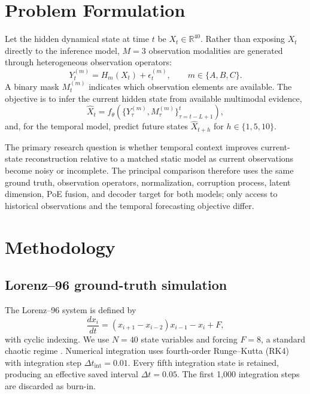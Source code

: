 \documentclass[10pt,twocolumn]{article}
\begin{document}
\section{Problem Formulation}
Let the hidden dynamical state at time $t$ be $X_t\in\mathbb{R}^{40}$. Rather than exposing $X_t$ directly to the inference model, $M=3$ observation modalities are generated through heterogeneous observation operators:
\begin{equation}
Y_t^{(m)}=H_m(X_t)+\epsilon_t^{(m)}, \qquad m\in\{A,B,C\}.
\end{equation}
A binary mask $M_t^{(m)}$ indicates which observation elements are available. The objective is to infer the current hidden state from available multimodal evidence,
\begin{equation}
\hat X_t=f_{\theta}\left(\{Y_{\tau}^{(m)},M_{\tau}^{(m)}\}_{\tau=t-L+1}^{t}\right),
\end{equation}
and, for the temporal model, predict future states $\hat X_{t+h}$ for $h\in\{1,5,10\}$.

The primary research question is whether temporal context improves current-state reconstruction relative to a matched static model as current observations become noisy or incomplete. The principal comparison therefore uses the same ground truth, observation operators, normalization, corruption process, latent dimension, PoE fusion, and decoder target for both models; only access to historical observations and the temporal forecasting objective differ.

\section{Methodology}
\subsection{Lorenz--96 ground-truth simulation}
The Lorenz--96 system is defined by
\begin{equation}
\frac{dx_i}{dt}=(x_{i+1}-x_{i-2})x_{i-1}-x_i+F,
\label{eq:l96}
\end{equation}
with cyclic indexing. We use $N=40$ state variables and forcing $F=8$, a standard chaotic regime \citep{lorenz1996predictability}. Numerical integration uses fourth-order Runge--Kutta (RK4) with integration step $\Delta t_{\mathrm{int}}=0.01$. Every fifth integration state is retained, producing an effective saved interval $\Delta t=0.05$. The first 1,000 integration steps are discarded as burn-in.
\end{document}
